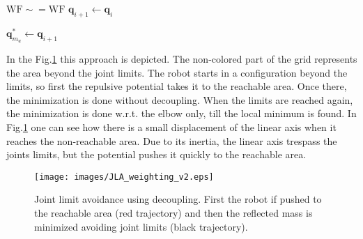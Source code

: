 \begin{algorithm}[H]
\begin{algorithmic}[1]
		
		

		
		\Else
		
		\State $\mathrm{WF \sim= WF }$ 
		\State $\mathbf{q}_{i+1} \leftarrow \mathbf{q}_i$
		
		\EndIf
		
		
		
		
		\EndIf
		
		\State $\mathbf{q}_{m_u}^\ast \leftarrow \mathbf{q}_{i+1}$ 
		
		\EndFor
	\end{algorithmic}
\end{algorithm}



  In the Fig.\ref{fig:wf_for_jla} this approach is depicted. The non-colored part of the grid represents the area beyond the joint limits. The robot starts in a configuration beyond the limits, so first the repulsive potential takes it to the reachable area. Once there, the minimization is done without decoupling. When the limits are reached again,  the minimization is done w.r.t. the elbow only, till the local minimum is found. In Fig.\ref{fig:wf_for_jla} one can see how there is a  small displacement of the linear axis when it reaches the non-reachable area. Due to its inertia, the linear axis trespass the joints limits, but the potential pushes it quickly to the reachable area.



\begin{figure}[!htb]
	\centerline{
		\texttt{[image: images/JLA\_weighting\_v2.eps]}}
	\caption{Joint limit avoidance using decoupling. First the robot if pushed to the reachable area (red trajectory) and then the reflected mass is minimized avoiding joint limits (black trajectory).}
	\label{fig:wf_for_jla}
\end{figure}




